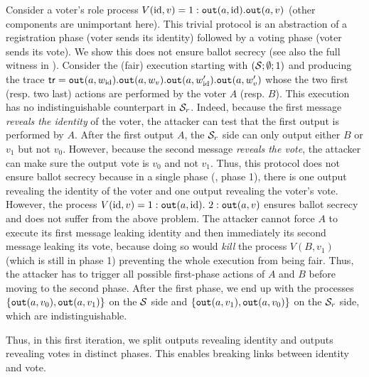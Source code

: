\begin{example}
\label{ex:leaking-phases}
Consider a voter's role process $V(\id,v)=
  \phase 1 \Out(a,\id). \Out(a,v)$
  (other components are unimportant here).
  This trivial protocol is an abstraction of a registration phase
  (voter sends its identity) followed by a voting phase (voter sends
  its vote).  We show this does not ensure ballot secrecy (see also the full witness
  in ).
  Consider the (fair) execution starting with $(\S;\emptyset;1)$
  and producing the trace $\tr=\Out(a,w_\id).\Out(a,w_v).\Out(a,w_\id').
  \Out(a,w_v')$
  whose the two first (resp. two last) actions are performed by the voter
  $A$ (resp. $B$).
  This execution has no indistinguishable counterpart in $\S_r$.
  Indeed, because the first message {\em reveals the identity} of the voter, 
  the attacker can test that the first output is performed by $A$.
  After the first output $A$, the $\S_r$ side can only output either $B$ or $v_1$
  but not $v_0$.
  However, because the second message {\em reveals the vote}, the attacker
  can make sure the output vote is $v_0$ and not $v_1$.
  Thus, this  protocol does not ensure ballot secrecy because %
  in a single phase (\ie, phase 1), there is one output revealing the identity
  of the voter and one output revealing the voter's vote.
%
  However, the process $V(\id,v)=\phase 1 \Out(a,\id).\ \phase 2 \Out(a,v)$ ensures
  ballot secrecy and does not suffer from the above problem.  
  The attacker cannot force $A$ to execute its first message leaking
  identity and then immediately its second message leaking its vote,
  because doing so would {\em kill} the process $V(B,v_1)$ (which is still in phase 1)
  preventing the whole execution from being fair.
  Thus, the attacker has to trigger all
  possible first-phase actions of $A$ and $B$ before moving to
  the second phase.
  After the first phase, we end up with
  the processes $\{\Out(a,v_0), \Out(a,v_1)\}$ on the $\S$ side and
  $\{\Out(a,v_1),\Out(a,v_0)\}$ on the $\S_r$ side, which are indistinguishable.
  
  Thus,
  in this first iteration, we split
  outputs revealing identity and outputs revealing votes in distinct
  phases. This enables breaking links between identity and vote.
\end{example}

